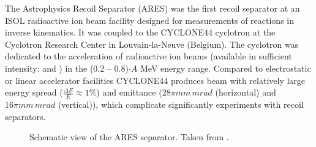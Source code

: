 The Astrophysics Recoil Separator (ARES) was the first recoil separator at an ISOL radioactive ion beam facility designed for measurements of  reactions in inverse kinematics. It was coupled to the CYCLONE44 cyclotron at the Cyclotron Research Center in Louvain-la-Neuve (Belgium). The cyclotron was dedicated to the acceleration of radioactive ion beams (available in sufficient intensity:  and ) in the (0.2 -- 0.8)$\cdot A$ MeV energy range. Compared to electrostatic or linear accelerator facilities CYCLONE44 produces beam with relatively large energy spread ($\frac{\Delta{}E}{E} \approx 1\%$) and emittance ($28\pi \unit{mm\,mrad}$ (horizontal) and $16\pi \unit{mm\,mrad}$ (vertical)), which complicate significantly experiments with recoil separators.
\begin{figure}
\caption{Schematic view of the ARES separator. Taken from \cite{coud03}.}
\label{fig:ares}
\end{figure}
